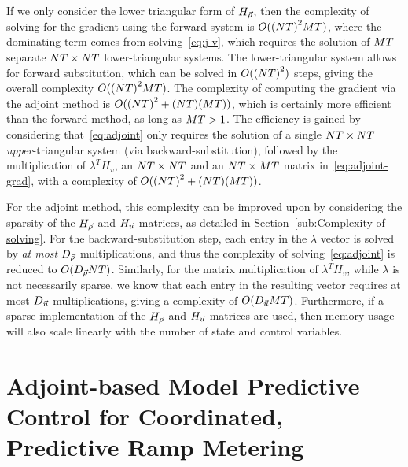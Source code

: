 If we only consider the lower triangular form of $H_{\vec{\rho}}$, then the
complexity of solving for the gradient using the forward system is
$O(\left(\nlinks\ntime\right)^{2}\ncontrols\ntime)$, where the dominating
term comes from solving~\eqref{eq:j-v}, which requires the solution
of $MT$ separate $NT\times NT$
lower-triangular systems. The lower-triangular system allows for forward
substitution, which can be solved in $O(\left(\nlinks\ntime\right)^{2})$
steps, giving the overall complexity $O(\left(\nlinks\ntime\right)^{2}\ncontrols\ntime)$.
The complexity of computing the gradient via the adjoint method is
$O(\left(\nlinks\ntime\right)^{2}+\left(\nlinks\ntime\right)\left(\ncontrols\ntime\right))$,
which is certainly more efficient than the forward-method, as long
as $MT>1$. The efficiency is gained by considering
that~\eqref{eq:adjoint} only requires the solution of a single $NT\times NT$
\emph{upper}-triangular system (via backward-substitution), followed
by the multiplication of $\lambda^{T}H_{v}$, an $NT\times NT$
and an $NT\times MT$ matrix in~\eqref{eq:adjoint-grad},
with a complexity of $O(\left(\nlinks\ntime\right)^{2}+\left(\nlinks\ntime\right)\left(\ncontrols\ntime\right))$.

For the adjoint method, this complexity can be improved upon by considering
the sparsity of the $H_{\vec{\rho}}$ and $H_{\vec{u}}$ matrices, as detailed in Section~\ref{sub:Complexity-of-solving}.
For the backward-substitution step, each entry in the $\lambda$ vector
is solved by \emph{at most} $D_{\vec{\rho}}$ multiplications, and
thus the complexity of solving~\eqref{eq:adjoint} is reduced to
$O(D_{\vec{\rho}}NT)$. Similarly, for the matrix multiplication
of $\lambda^{T}H_{v}$, while $\lambda$ is not necessarily sparse,
we know that each entry in the resulting vector requires at most $D_{\vec{u}}$
multiplications, giving a complexity of $O(D_{\vec{u}}MT)$. Furthermore, if a sparse implementation of the $H_{\vec{\rho}}$ and $H_{\vec{u}}$ matrices are used, then memory usage will also scale linearly with the number of state and control variables.


\section{Adjoint-based Model Predictive Control for Coordinated, Predictive Ramp Metering}
\label{sec:adjoint-based-model}

